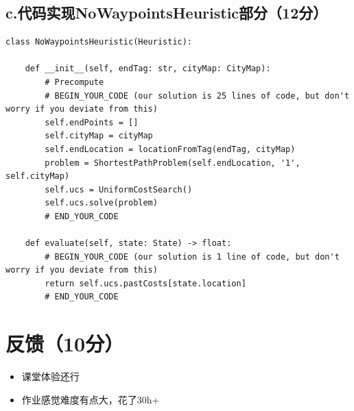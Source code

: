 \documentclass{article}
\begin{document}
\subsection*{c.代码实现NoWaypointsHeuristic部分（12分）}
\begin{lstlisting}
class NoWaypointsHeuristic(Heuristic):
    
    def __init__(self, endTag: str, cityMap: CityMap):
        # Precompute
        # BEGIN_YOUR_CODE (our solution is 25 lines of code, but don't worry if you deviate from this)
        self.endPoints = []
        self.cityMap = cityMap
        self.endLocation = locationFromTag(endTag, cityMap)
        problem = ShortestPathProblem(self.endLocation, '1', self.cityMap)
        self.ucs = UniformCostSearch()
        self.ucs.solve(problem)
        # END_YOUR_CODE

    def evaluate(self, state: State) -> float:
        # BEGIN_YOUR_CODE (our solution is 1 line of code, but don't worry if you deviate from this)
        return self.ucs.pastCosts[state.location]
        # END_YOUR_CODE
\end{lstlisting}


\section*{反馈（10分）}

\begin{itemize}
    \item 课堂体验还行
    \item 作业感觉难度有点大，花了30h+
\end{itemize}
\end{document}
